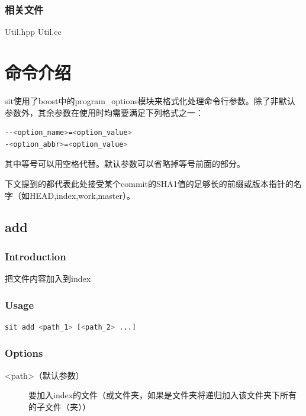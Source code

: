 \documentclass[11pt, a4paper, UTF8]{ctexart}
\begin{document}
\subsubsection{相关文件}
Util.hpp Util.cc


\section{命令介绍}
sit使用了boost中的program\_options模块来格式化处理命令行参数。除了非默认参数外，其余参数在使用时均需要满足下列格式之一：
\begin{lstlisting}[language=sh,basicstyle=\small\YaHeiMono,numbers=none]
--<option_name>=<option_value>
-<option_abbr>=<option_value>
\end{lstlisting}

其中等号可以用空格代替。默认参数可以省略掉等号前面的部分。 

下文提到的{}都代表此处接受某个commit的SHA1值的足够长的前缀或版本指针的名字（如HEAD,index,work,master）。
\subsection{add}
\subsubsection* {Introduction}
把文件内容加入到index
\subsubsection*{Usage}
\begin{lstlisting}[language=sh,basicstyle=\small\YaHeiMono,numbers=none]
sit add <path_1> [<path_2> ...]
\end{lstlisting}
\subsubsection*{Options}
\begin{description}
	\item[\YaHeiMono <path>（默认参数）] 要加入index的文件（或文件夹，如果是文件夹将递归加入该文件夹下所有的子文件（夹））
\end{description}
\end{document}
